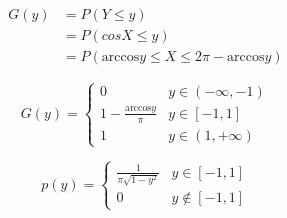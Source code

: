 \documentclass[10pt, a4paper,twocolumn]{article}
\begin{document}
    $$
        \begin{aligned}
            G(y) &= P(Y \leqslant y) \\
                &= P(cosX \leqslant y) \\ 
                &= P(\text{arccos}y \leqslant X \leqslant 2\pi - \text{arccos}y)
        \end{aligned}
    $$

    $$
        G(y) = 
        \begin{cases}
            0 & y \in (-\infty, -1) \\
            1 - \frac{\text{arccos}y}{\pi} & y \in [-1, 1] \\ 
            1 & y \in (1, +\infty)
        \end{cases}
    $$

    $$
        p(y) = 
        \begin{cases}
            \frac{1}{\pi\sqrt{1 - y^2}} & y \in [-1, 1] \\
            0 & y \notin [-1, 1]
        \end{cases}
    $$
\end{document}
